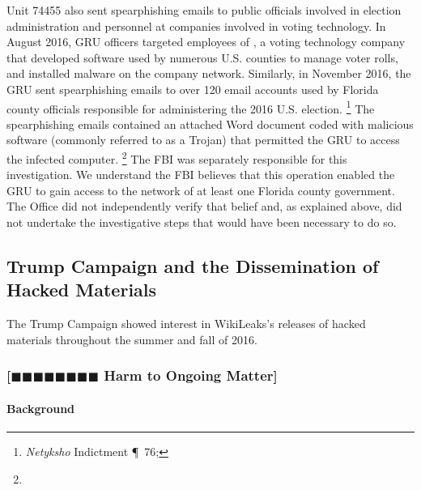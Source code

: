 Unit 74455 also sent spearphishing emails to public officials involved in election administration and personnel at companies involved in voting technology.
In August 2016, GRU officers targeted employees of , a voting technology company that developed software used by numerous U.S. counties to manage voter rolls, and installed malware on the company network.
Similarly, in November 2016, the GRU sent spearphishing emails to over 120 email accounts used by Florida county officials responsible for administering the 2016 U.S. election.%
\footnote{\textit{Netyksho} Indictment \P~76; }
The spearphishing emails contained an attached Word document coded with malicious software (commonly referred to as a Trojan) that permitted the GRU to access the infected computer.%
\footnote{}
The FBI was separately responsible for this investigation.
We understand the FBI believes that this operation enabled the GRU to gain access to the network of at least one Florida county government.
The Office did not independently verify that belief and, as explained above, did not undertake the investigative steps that would have been necessary to do so.

\subsection{Trump Campaign and the Dissemination of Hacked Materials}

The Trump Campaign showed interest in WikiLeaks's releases of hacked materials throughout the summer and fall of 2016.

\subsubsection{[$\blacksquare\blacksquare\blacksquare\blacksquare\blacksquare\blacksquare\blacksquare\blacksquare$ Harm to Ongoing Matter]}

\paragraph{Background}


